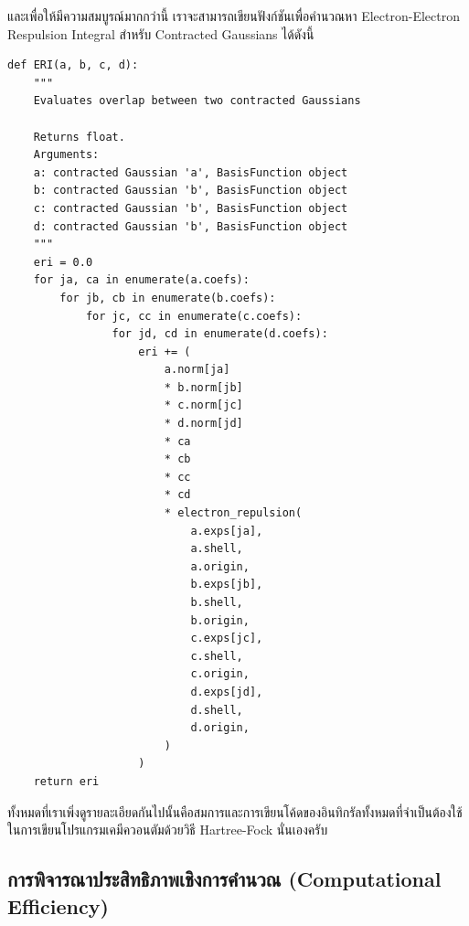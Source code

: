 \vspace{5pt}

\noindent และเพื่อให้มีความสมบูรณ์มากกว่านี้ เราจะสามารถเขียนฟังก์ชันเพื่อคำนวณหา Electron-Electron Respulsion Integral 
สำหรับ Contracted Gaussians ได้ดังนี้ 

\vspace{5pt}

\begin{lstlisting}[style=MyPython]
def ERI(a, b, c, d):
    """
    Evaluates overlap between two contracted Gaussians

    Returns float.
    Arguments:
    a: contracted Gaussian 'a', BasisFunction object
    b: contracted Gaussian 'b', BasisFunction object
    c: contracted Gaussian 'b', BasisFunction object
    d: contracted Gaussian 'b', BasisFunction object
    """
    eri = 0.0
    for ja, ca in enumerate(a.coefs):
        for jb, cb in enumerate(b.coefs):
            for jc, cc in enumerate(c.coefs):
                for jd, cd in enumerate(d.coefs):
                    eri += (
                        a.norm[ja]
                        * b.norm[jb]
                        * c.norm[jc]
                        * d.norm[jd]
                        * ca
                        * cb
                        * cc
                        * cd
                        * electron_repulsion(
                            a.exps[ja],
                            a.shell,
                            a.origin,
                            b.exps[jb],
                            b.shell,
                            b.origin,
                            c.exps[jc],
                            c.shell,
                            c.origin,
                            d.exps[jd],
                            d.shell,
                            d.origin,
                        )
                    )
    return eri
\end{lstlisting}

\vspace{5pt}

ทั้งหมดที่เราเพิ่งดูรายละเอียดกันไปนั้นคือสมการและการเขียนโค้ดของอินทิกรัลทั้งหมดที่จำเป็นต้องใช้ในการเขียนโปรแกรมเคมีควอนตัมด้วยวิธี
Hartree-Fock นั่นเองครับ

\subsection{การพิจารณาประสิทธิภาพเชิงการคำนวณ (Computational Efficiency)}

